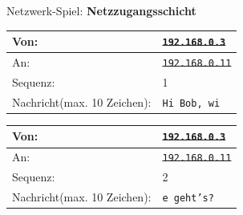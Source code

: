 \begin{frame}{Netzwerk-Spiel: \textbf{Netzzugangsschicht}}
    \begin{table}[H]
        \centering
        \begin{tabular}{p{2cm}l}
            \rowcolor{\networkLayerColor!20} Von:                                         & \sout{\texttt{192.168.0.3}}  \\\midrule
            \rowcolor{\networkLayerColor!20} An:                                          & \sout{\texttt{192.168.0.11}} \\\midrule
            \rowcolor{\transportLayerColor!20}Sequenz:                                    & 1                            \\\midrule
            \rowcolor{\applicationLayerColor!20}Nachricht\newline\tiny (max. 10 Zeichen): & \texttt{Hi Bob, wi}          \\
        \end{tabular}
        \begin{tabular}{p{2cm}l}
            \rowcolor{\networkLayerColor!20} Von:                                         & \sout{\texttt{192.168.0.3}}  \\\midrule
            \rowcolor{\networkLayerColor!20} An:                                          & \sout{\texttt{192.168.0.11}} \\\midrule
            \rowcolor{\transportLayerColor!20}Sequenz:                                    & 2                            \\\midrule
            \rowcolor{\applicationLayerColor!20}Nachricht\newline\tiny (max. 10 Zeichen): & \texttt{e geht's?}           \\
        \end{tabular}
    \end{table}
\end{frame}

